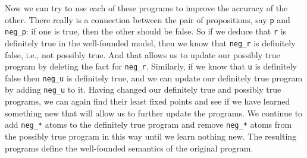 Now we can try to use each of these programs to improve the accuracy
of the other.  There really is a connection between the pair of
propositions, say \verb|p| and \verb|neg_p|: if one is true, then the
other should be false.  So if we deduce that \verb|r| is definitely
true in the well-founded model, then we know that \verb|neg_r| is
definitely false, i.e., not possibly true.  And that allows us to
update our possibly true program by deleting the fact for
\verb|neg_r|.  Similarly, if we know that \verb|u| is definitely false
then \verb|neg_u| is definitely true, and we can update our definitely
true program by adding \verb|neg_u| to it.  Having changed our
definitely true and possibly true programs, we can again find their
least fixed points and see if we have learned something new that will
allow us to further update the programs.  We continue to add
\verb|neg_*| atoms to the definitely true program and remove
\verb|neg_*| atoms from the possibly true program in this way until we
learn nothing new.  The resulting programs define the well-founded
semantics of the original program.

